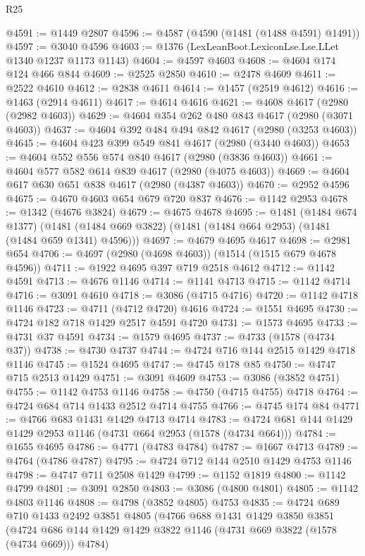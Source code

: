 \begin{lexlean}{R25}
\begin{coremodule}
@4591 := @1449 @2807
@4596 := @4587 (@4590 (@1481 (@1488 @4591) @1491))
@4597 := @3040 @4596
@4603 := @1376 (LexLeanBoot.LexiconLse.Lse.LLet @1340 @1237 @1173 @1143)
@4604 := @4597 @4603
@4608 := @4604 @174 @124 @466 @844
@4609 := @2525 @2850
@4610 := @2478 @4609
@4611 := @2522 @4610
@4612 := @2838 @4611
@4614 := @1457 (@2519 @4612)
@4616 := @1463 (@2914 @4611)
@4617 := @4614 @4616
@4621 := @4608 @4617 (@2980 (@2982 @4603))
@4629 := @4604 @354 @262 @480 @843 @4617 (@2980 (@3071 @4603))
@4637 := @4604 @392 @484 @494 @842 @4617 (@2980 (@3253 @4603))
@4645 := @4604 @423 @399 @549 @841 @4617 (@2980 (@3440 @4603))
@4653 := @4604 @552 @556 @574 @840 @4617 (@2980 (@3836 @4603))
@4661 := @4604 @577 @582 @614 @839 @4617 (@2980 (@4075 @4603))
@4669 := @4604 @617 @630 @651 @838 @4617 (@2980 (@4387 @4603))
@4670 := @2952 @4596
@4675 := @4670 @4603 @654 @679 @720 @837
@4676 := @1142 @2953
@4678 := @1342 (@4676 @3824)
@4679 := @4675 @4678
@4695 := @1481
    (@1484 @674 @1377)
    (@1481 (@1484 @669 @3822) (@1481 (@1484 @664 @2953) (@1481 (@1484 @659 @1341) @4596)))
@4697 := @4679 @4695 @4617
@4698 := @2981 @654
@4706 := @4697 (@2980 (@4698 @4603)) (@1514 (@1515 @679 @4678 @4596))
@4711 := @1922 @4695 @397 @719 @2518 @4612
@4712 := @1142 @4591
@4713 := @4676 @1146
@4714 := @1141 @4713
@4715 := @1142 @4714
@4716 := @3091 @4610
@4718 := @3086 (@4715 @4716)
@4720 := @1142 @4718 @1146
@4723 := @4711 (@4712 @4720) @4616
@4724 := @1551 @4695
@4730 := @4724 @182 @718 @1429 @2517 @4591 @4720
@4731 := @1573 @4695
@4733 := @4731 @37 @4591
@4734 := @1579 @4695
@4737 := @4733 (@1578 (@4734 @37))
@4738 := @4730 @4737
@4744 := @4724 @716 @144 @2515 @1429 @4718 @1146
@4745 := @1524 @4695
@4747 := @4745 @178 @85
@4750 := @4747 @715 @2513 @1429
@4751 := @3091 @4609
@4753 := @3086 (@3852 @4751)
@4755 := @1142 @4753 @1146
@4758 := @4750 (@4715 @4755) @4718
@4764 := @4724 @684 @714 @1433 @2512 @4714 @4755
@4766 := @4745 @174 @84
@4771 := @4766 @683 @1431 @1429 @4713 @4714
@4783 := @4724 @681 @144 @1429 @1429 @2953 @1146 (@4731 @664 @2953 (@1578 (@4734 @664)))
@4784 := @1655 @4695
@4786 := @4771 (@4783 @4784)
@4787 := @1667 @4713
@4789 := @4764 (@4786 @4787)
@4795 := @4724 @712 @144 @2510 @1429 @4753 @1146
@4798 := @4747 @711 @2508 @1429
@4799 := @1152 @1819
@4800 := @1142 @4799
@4801 := @3091 @2850
@4803 := @3086 (@4800 @4801)
@4805 := @1142 @4803 @1146
@4808 := @4798 (@3852 @4805) @4753
@4835 := @4724
    @689
    @710
    @1433
    @2492
    @3851
    @4805
    (@4766
      @688
      @1431
      @1429
      @3850
      @3851
      (@4724 @686 @144 @1429 @1429 @3822 @1146 (@4731 @669 @3822 (@1578 (@4734 @669))) @4784)

\end{coremodule}
\end{lexlean}
